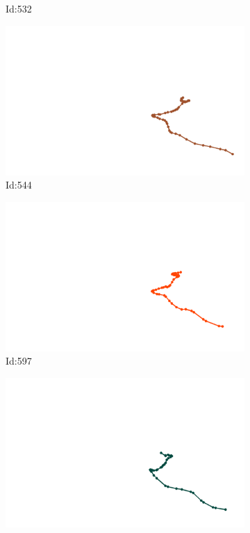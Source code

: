 \documentclass[12pt,twoside]{report}
\begin{document}
\begin{figure}
\begin{subfigure}[b]{0.20\textwidth}
\caption{Id:532}
\end{subfigure}
\begin{subfigure}[b]{0.20\textwidth}
\centering
\includegraphics[width=\textwidth]{../trajectories/544.png}
\caption{Id:544}
\end{subfigure}
\begin{subfigure}[b]{0.20\textwidth}
\centering
\includegraphics[width=\textwidth]{../trajectories/597.png}
\caption{Id:597}
\end{subfigure}
\begin{subfigure}[b]{0.20\textwidth}
\centering
\includegraphics[width=\textwidth]{../trajectories/615.png}

\end{subfigure}
\end{figure}
\end{document}
